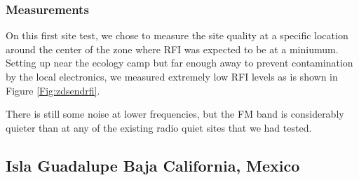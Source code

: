 \subsubsection{Measurements}

On this first site test, we chose to measure the site quality at a specific location around the center of the zone where RFI was expected to be at a miniumum. Setting up near the ecology camp but far enough away to prevent contamination by the local electronics, we measured extremely low RFI levels as is shown in Figure \ref{Fig:zdsendrfi}.

There is still some noise at lower frequencies, but the FM band is considerably quieter than at any of the existing radio quiet sites that we had tested. 

\subsection{Isla Guadalupe Baja California, Mexico}

